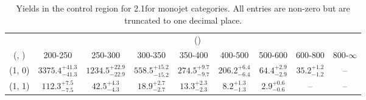\begin{table}[h!]
\tiny
\centering
\caption{Yields in the \mj control region for 2.1\ifb for monojet categories. All entries are non-zero but are truncated to one decimal place.\label{tab:yieldssep_mu_wjetstolnuht_mono}}
\begin{tabular}
{ccccccccc}
	\hline\hline
	& \multicolumn{8}{c}{\scalht (\gev)} \\ 
	 (\njet,  \nb) & 200-250 & 250-300 & 300-350 & 350-400 & 400-500 & 500-600 & 600-800 & 800-$\infty$ \\ [0.8ex] 
\hline
	(1, 0) & $3375.4^{+ 41.3 }_{- 41.3 }$ & $1234.5^{+ 22.9 }_{- 22.9 }$ & $558.5^{+ 15.2 }_{- 15.2 }$ & $274.5^{+ 9.7 }_{- 9.7 }$ & $206.2^{+ 6.4 }_{- 6.4 }$ & $64.4^{+ 2.9 }_{- 2.9 }$ & $35.2^{+ 1.2 }_{- 1.2 }$ & -- \\[0.5ex] 
	(1, 1) & $112.3^{+ 7.5 }_{- 7.5 }$ & $42.5^{+ 4.3 }_{- 4.3 }$ & $18.9^{+ 2.7 }_{- 2.7 }$ & $13.3^{+ 2.3 }_{- 2.3 }$ & $8.2^{+ 1.3 }_{- 1.3 }$ & $2.9^{+ 0.6 }_{- 0.6 }$ & -- & -- \\[0.5ex] 
	\hline
	\hline
\end{tabular}
\end{table}
